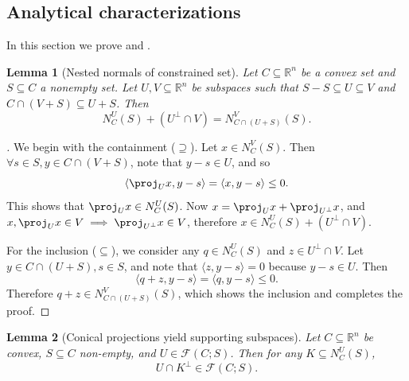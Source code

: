 \documentclass{article}
\theoremstyle{plain}
\newtheorem{lemma}{Lemma}[section]
\theoremstyle{definition}
\theoremstyle{remark}
\begin{document}
\subsection{Analytical characterizations}
\label{loc:body.proofs.analytical_characterizations}
In this section we prove  and 
.
\begin{lemma}[Nested normals of constrained set]
\label{loc:nested_normals_of_constrained_set.statement}
Let $C \subseteq \mathbb{R}^n$ be a convex set and $S \subseteq C$ a
nonempty set. Let $U, V \subseteq \mathbb{R}^n$ be subspaces such that $S - S \subseteq U \subseteq V$ and $C \cap (V + S) \subseteq U + S$. Then
\begin{equation*}
N_C^U(S) + (U^\perp \cap V) = N_{C \cap (U + S)}^V(S).
\end{equation*}
\end{lemma}
\begin{proof}[\hypertarget{loc:nested_normals_of_constrained_set.proof}Proof of \Cref{loc:nested_normals_of_constrained_set.statement}]

We begin with the containment ($\supseteq$). 
Let $x \in N_C^V(S).$ Then 
$\forall s \in S, y \in C  \cap (V+S)$, note that
$y-s \in U$, and so
\begin{equation*}
\langle \proj_U x, y-s\rangle = \langle x, y-s\rangle \le 0.
\end{equation*}
This shows that $\proj_U x \in N_C^U(S)$. Now $x = \proj_U x + \proj_{U^\perp} x$,
and $x, \proj_{U} x \in V \implies \proj_{U^\perp}x \in V$, 
therefore $x \in N_C^U(S) + (U^\perp  \cap  V)$.

For the inclusion ($\subseteq$), we consider any $q \in N^U_C(S)$ and 
$z \in U^\perp \cap V$. Let $y \in C \cap (U+S), s \in S$, and note that
$\langle z,y-s\rangle=0$ because $y-s  \in U$. Then 
\begin{equation*}
\langle q+z,  y-s\rangle =  \langle q, y-s\rangle \le 0.
\end{equation*}
Therefore $q + z  \in N_{C \cap (U + S)}^V(S)$, which shows the inclusion and completes the proof.
\end{proof}
\begin{lemma}[Conical projections yield supporting subspaces]
\label{loc:conical_projections_yield_supporting_subspaces.statement}
Let $C \subseteq \mathbb{R}^n$ be convex, $S \subseteq C$ non-empty, 
and $U \in \mathcal{F}(C;S)$. Then for any $K \subseteq N^U_C(S)$,
\begin{equation*}
U \cap K^\perp \in \mathcal{F}(C;S).
\end{equation*}
\end{lemma}
\end{document}
